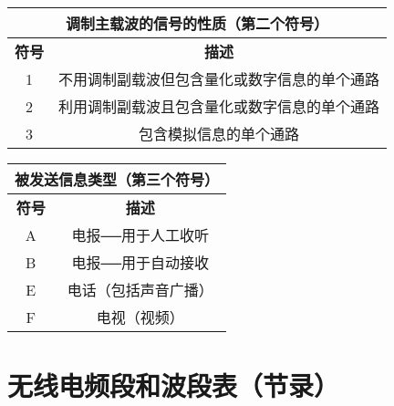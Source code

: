 \bigskip

\begin{tabular}{|c|c|}
  \hline
  \multicolumn{2}{|c|}{\textbf{调制主载波的信号的性质（第二个符号）}} \\
  \hline
  \textbf{符号} & \textbf{描述}                         \\
  \hline
  1           & 不用调制副载波但包含量化或数字信息的单个通路              \\
  \hline
  2           & 利用调制副载波且包含量化或数字信息的单个通路              \\
  \hline
  3           & 包含模拟信息的单个通路                         \\
  \hline
\end{tabular}

\bigskip

\begin{tabular}{|c|c|}
  \hline
  \multicolumn{2}{|c|}{\textbf{被发送信息类型（第三个符号）}} \\
  \hline
  \textbf{符号} & \textbf{描述}                     \\
  \hline
  A           & 电报──用于人工收听                      \\
  \hline
  B           & 电报──用于自动接收                      \\
  \hline
  E           & 电话（包括声音广播）                      \\
  \hline
  F           & 电视（视频）                          \\
  \hline
\end{tabular}

\newpage

\section{无线电频段和波段表（节录）}

